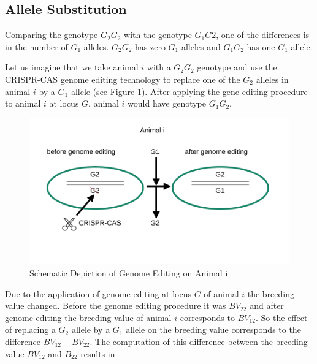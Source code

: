 \documentclass[
]{book}
\theoremstyle{definition}
\theoremstyle{definition}
\theoremstyle{definition}
\theoremstyle{remark}
\begin{document}
\vspace{5ex}

\hypertarget{allele-substitution}{%
\subsection{Allele Substitution}\label{allele-substitution}}

Comparing the genotype \(G_2G_2\) with the genotype \(G_1G2\), one of the differences is in the number of \(G_1\)-alleles. \(G_2G_2\) has zero \(G_1\)-alleles and \(G_1G_2\) has one \(G_1\)-allele.

Let us imagine that we take animal \(i\) with a \(G_2G_2\) genotype and use the CRISPR-CAS genome editing technology to replace one of the \(G_2\) alleles in animal \(i\) by a \(G_1\) allele (see Figure \ref{fig:genome-editing-allele-substitution}). After applying the gene editing procedure to animal \(i\) at locus \(G\), animal \(i\) would have genotype \(G_1G_2\).

\begin{figure}[!ht]
\includegraphics[width=1\linewidth,]{odg/genome-editing-allele-substitution} \caption{Schematic Depiction of Genome Editing on Animal i}\label{fig:genome-editing-allele-substitution}
\end{figure}

Due to the application of genome editing at locus \(G\) of animal \(i\) the breeding value changed. Before the genome editing procedure it was \(BV_{22}\) and after genome editing the breeding value of animal \(i\) corresponds to \(BV_{12}\). So the effect of replacing a \(G_2\) allele by a \(G_1\) allele on the breeding value corresponds to the difference \(BV_{12} - BV_{22}\). The computation of this difference between the breeding value \(BV_{12}\) and \(B_{22}\) results in
\end{document}
